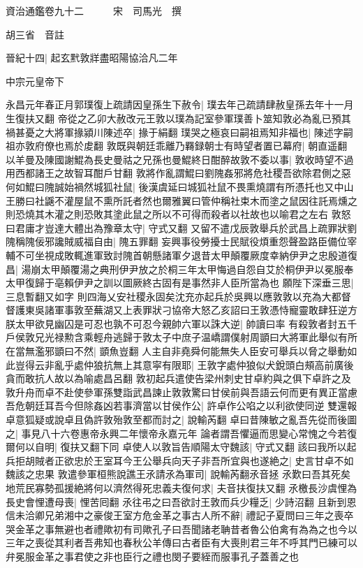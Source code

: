 資治通鑑卷九十二　　　宋　司馬光　撰

胡三省　音註

晉紀十四|{
	起玄黓敦牂盡昭陽協洽凡二年}


中宗元皇帝下

永昌元年春正月郭璞復上疏請因皇孫生下赦令|{
	璞去年己疏請肆赦皇孫去年十一月生復扶又翻}
帝從之乙卯大赦改元王敦以璞為記室參軍璞善卜筮知敦必為亂已預其禍甚憂之大將軍掾潁川陳述卒|{
	掾于絹翻}
璞哭之極哀曰嗣祖焉知非福也|{
	陳述字嗣祖亦敦府僚也焉於䖍翻}
敦既與朝廷乖離乃羇録朝士有時望者置已幕府|{
	朝直遥翻}
以羊曼及陳國謝鯤為長史曼祜之兄孫也曼鯤終日酣醉故敦不委以事|{
	敦收時望不過用西都諸王之故智耳酣戶甘翻}
敦將作亂謂鯤曰劉隗姦邪將危社稷吾欲除君側之惡何如鯤曰隗誠始禍然城狐社鼠|{
	後漢虞延曰城狐社鼠不畏熏燒謂有所憑托也又中山王勝曰社鼷不灌屋鼠不熏所託者然也爾雅翼曰管仲稱社束木而塗之鼠因往託焉燻之則恐燒其木灌之則恐敗其塗此鼠之所以不可得而殺者以社故也以喻君之左右}
敦怒曰君庸才豈達大體出為豫章太守|{
	守式又翻}
又留不遣戊辰敦舉兵於武昌上疏罪狀劉隗稱隗佞邪讒賊威福自由|{
	隗五罪翻}
妄興事役勞擾士民賦役煩重怨聲盈路臣備位宰輔不可坐視成敗輒進軍致討隗首朝懸諸軍夕退昔太甲顛覆厥度幸納伊尹之忠殷道復昌|{
	湯崩太甲顛覆湯之典刑伊尹放之於桐三年太甲悔過自怨自艾於桐伊尹以冕服奉太甲復歸于亳賴伊尹之訓以圖厥終古固有是事然非人臣所當為也}
願陛下深垂三思|{
	三息暫翻又如字}
則四海乂安社稷永固矣沈充亦起兵於吳興以應敦敦以充為大都督督護東吳諸軍事敦至蕪湖又上表罪狀刁協帝大怒乙亥詔曰王敦憑恃寵靈敢肆狂逆方朕太甲欲見幽囚是可忍也孰不可忍今親帥六軍以誅大逆|{
	帥讀曰率}
有殺敦者封五千戶侯敦兄光禄勲含乘輕舟逃歸于敦太子中庶子温嶠謂僕射周顗曰大將軍此舉似有所在當無濫邪顗曰不然|{
	顗魚豈翻}
人主自非堯舜何能無失人臣安可舉兵以脅之舉動如此豈得云非亂乎處仲狼抗無上其意寜有限耶|{
	王敦字處仲狼似犬銳頭白頰高前廣後貪而敢抗人故以為喻處昌呂翻}
敦初起兵遣使告梁州刺史甘卓約與之俱下卓許之及敦升舟而卓不赴使參軍孫雙詣武昌諫止敦敦驚曰甘侯前與吾語云何而更有異正當慮吾危朝廷耳吾今但除姦凶若事濟當以甘侯作公|{
	許卓作公啗之以利欲使同逆}
雙還報卓意狐疑或說卓且偽許敦殆敦至都而討之|{
	說輸芮翻}
卓曰昔陳敏之亂吾先從而後圖之|{
	事見八十六卷惠帝永興二年懷帝永嘉元年}
論者謂吾懼逼而思變心常愧之今若復爾何以自明|{
	復扶又翻下同}
卓使人以敦旨告順陽太守魏該|{
	守式又翻}
該曰我所以起兵拒胡賊者正欲忠於王室耳今王公舉兵向天子非吾所宜與也遂絶之|{
	史言甘卓不如魏該之忠果}
敦遣參軍桓熊說譙王氶請氶為軍司|{
	說輸芮翻氶音拯}
氶歎曰吾其死矣地荒民寡勢孤援絶將何以濟然得死忠義夫復何求|{
	夫音扶復扶又翻}
氶檄長沙虞悝為長史會悝遭母喪|{
	悝苦囘翻}
氶往弔之曰吾欲討王敦而兵少糧乏|{
	少詩沼翻}
且新到恩信未洽卿兄弟湘中之豪俊王室方危金革之事古人所不辭|{
	禮記子夏問曰三年之喪卒哭金革之事無避也者禮歟初有司歟孔子曰吾聞諸老聃昔者魯公伯禽有為為之也今以三年之喪從其利者吾弗知也春秋公羊傳曰古者臣有大喪則君三年不呼其門已練可以弁冕服金革之事君使之非也臣行之禮也閔子要絰而服事孔子蓋善之也}
